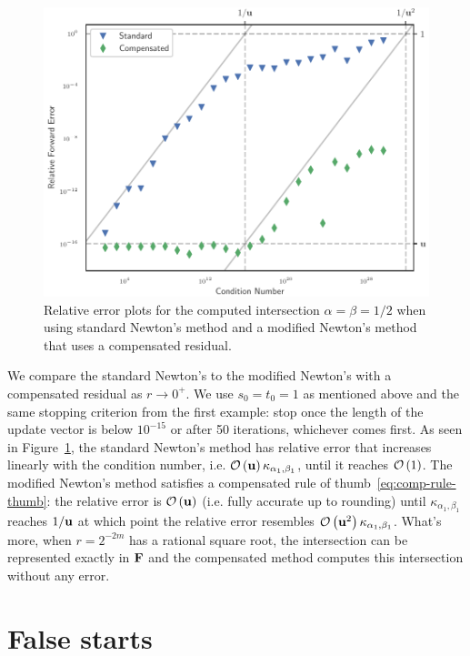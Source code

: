 \begin{figure}
  \includegraphics{../images/compensated-newton/almost_tangent.pdf}
  \centering
  \captionsetup{width=.75\linewidth}
  \caption{Relative error plots for the computed intersection
    \(\alpha = \beta = 1/2\)
    when using standard Newton's method and a modified Newton's method that
    uses a compensated residual.}
  \label{fig:almost-tangent}
\end{figure}

We compare the standard Newton's to the modified Newton's with a compensated
residual as \(r \to 0^+\). We use \(s_0 = t_0 = 1\) as mentioned above
and the same stopping criterion from the first example: stop once the length
of the update vector is below \(10^{-15}\) or after 50 iterations, whichever
comes first. As seen in Figure~\ref{fig:almost-tangent}, the standard
Newton's method has relative error that increases linearly with
the condition number, i.e. \(\mathcal{O}\left(\mathbf{u}\right) \kappa_{\alpha_1, \beta_1}\),
until it reaches \(\mathcal{O}\left(1\right)\). The
modified Newton's method satisfies a compensated rule of
thumb~\eqref{eq:comp-rule-thumb}: the relative error is \(\mathcal{O}\left(\mathbf{u}\right)\)
(i.e. fully accurate up to rounding) until \(\kappa_{\alpha_1, \beta_1}\)
reaches \(1 / \mathbf{u}\) at which point the relative error resembles
\(\mathcal{O}\left(\mathbf{u}^2\right) \kappa_{\alpha_1, \beta_1}\). What's more, when
\(r = 2^{-2m}\) has a rational square root, the intersection
can be represented exactly in \(\mathbf{F}\) and the compensated method
computes this intersection without any error.

\section{False starts}\label{sec:false-starts}

